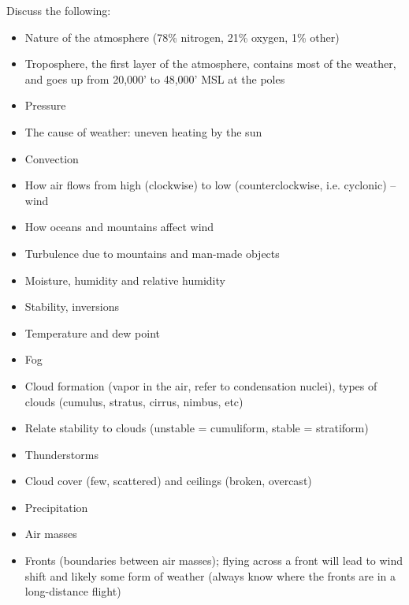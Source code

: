 Discuss the following:
\begin{itemize}
  \item Nature of the atmosphere (78\% nitrogen, 21\% oxygen, 1\% other)

  \item Troposphere, the first layer of the atmosphere, contains most of the
    weather, and goes up from 20,000' to 48,000' MSL at the poles

  \item Pressure

  \item The cause of weather: uneven heating by the sun

  \item Convection

  \item How air flows from high (clockwise) to low (counterclockwise, i.e.
    cyclonic) – wind

  \item How oceans and mountains affect wind

  \item Turbulence due to mountains and man-made objects

  \item Moisture, humidity and relative humidity

  \item Stability, inversions

  \item Temperature and dew point

  \item Fog

  \item Cloud formation (vapor in the air, refer to condensation nuclei), types
    of clouds (cumulus, stratus, cirrus, nimbus, etc)

  \item Relate stability to clouds (unstable = cumuliform, stable = stratiform)

  \item Thunderstorms

  \item Cloud cover (few, scattered) and ceilings (broken, overcast)

  \item Precipitation

  \item Air masses

  \item Fronts (boundaries between air masses); flying across a front will lead
    to wind shift and likely some form of weather (always know where the fronts
    are in a long-distance flight)


\end{itemize}
